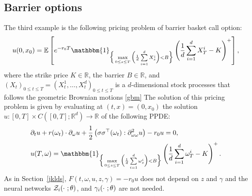 \documentclass[12pt]{article}
\numberwithin{equation}{section}
\newcommand{\E}{\mathbb{E}}
\newcommand{\real}{\mathbb{R}}
\let\oldcitet=\citet
\renewcommand{\cite}[1]{\textcolor[rgb]{0,0,1}{\oldcitet{#1}}}
\renewcommand{\citet}[1]{\textcolor[rgb]{0,0,1}{\oldcitet{#1}}}
\begin{document}

\subsection{Barrier options}
The third example is the following pricing problem of barrier basket call option:
\begin{equation}
\nonumber %
    u(0, x_0) = \E \left[ e^{-r_0T} \mathbbm{1}_{\Big\{ \max\limits_{0 \leq s \leq T} \Big(\frac{1}{d}\sum\limits_{i = 1}^d X^i_s\Big) < B \Big\}}\left(\frac{1}{d}\sum\limits_{i = 1}^d X^i_T - K \right)^+ \right],
\end{equation}
where the strike price $K \in \real$,
the barrier $B \in \real$,
and $(X_t)_{0 \leq t \leq T} = (X^1_t, \dots, X^d_t)_{0 \leq t \leq T}$
is a $d$-dimensional stock processes that follows
the geometric Brownian motions \eqref{gbm}
The solution of this pricing problem is given by
evaluating at $(t,x)=(0, x_0)$
the solution $u:[0,T] \times C\left([0,T]; \real^d\right) \rightarrow \real$
 of the following PPDE:
\begin{align}
    \nonumber
    & \partial_t u + r(\omega_t) \cdot \partial_\omega u
    + \frac{1}{2} \left( \sigma\sigma^\top (\omega_t):\partial^2_{\omega\omega}u \right) - r_0u = 0,
    \\
\nonumber %
    & u(T, \omega) = \mathbbm{1}_{\Big\{ \max\limits_{0 \leq s \leq T} \Big(\frac{1}{d}\sum\limits_{i = 1}^d \omega^i_s\Big) < B \Big\}}\left(\frac{1}{d}\sum\limits_{i = 1}^d \omega^i_T - K \right)^+.
\end{align}
As in Section~\ref{jklds},
 $F(t, \omega, u, z, \gamma) = -r_0 u$ does not depend on
 $z$ and $\gamma$ and
the neural networks ${\cal Z}_i(\cdot \ ;\theta)$, and
${\cal \gamma}_i(\cdot \ ;\theta)$
are not needed.
\end{document}
